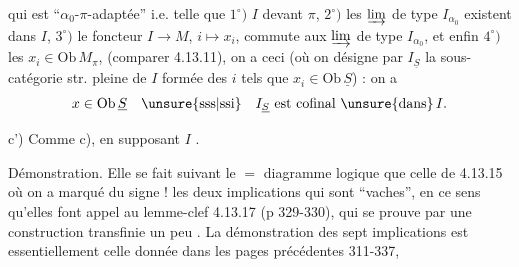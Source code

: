 
qui est ``$\alpha_0$-$\pi$-adaptée'' i.e. telle que   $1^\circ)$ $I$   devant $\pi$, $2^\circ)$ les $\varinjlim$ de type $I_{\alpha_0}$ existent dans $I$, $3^\circ)$ le foncteur $I\longrightarrow M$, $i\mapsto x_i$, commute aux $\varinjlim$ de type $I_{\alpha_0}$, et enfin $4^\circ)$ les $x_i\in\mathrm{Ob}\,M_\pi$, (comparer 4.13.11), on a ceci (où on désigne par $I_{\underline S}$ la sous-catégorie str. pleine de $I$ formée des $i$ tels que $x_i\in\mathrm{Ob}\,\underline S$) : on a
\[
 x\in\mathrm{Ob}\,\underline S\quad\text{\unsure{sss|ssi}}\quad I_{\underline S}\text{ est cofinal }\unsure{\text{dans}}\,I.
\]

c')  Comme c),  en supposant $I$ .



Démonstration. Elle se fait suivant le $=$ diagramme logique que celle de 4.13.15
où on a marqué du signe ! les deux implications qui sont ``vaches'', en ce sens qu'elles font appel au lemme-clef 4.13.17 (p 329-330), qui se prouve par une construction transfinie un peu . La démonstration  des sept implications  est essentiellement celle donnée dans les pages précédentes 311-337,


